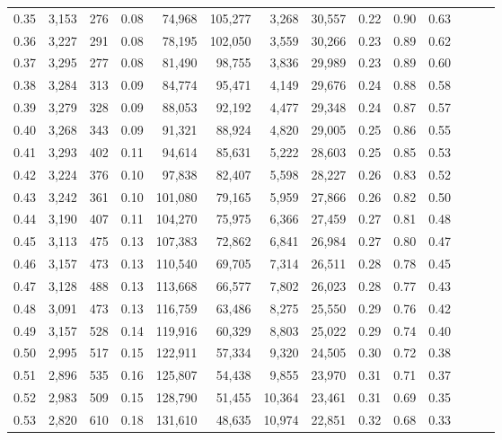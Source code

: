 \begin{tabular}{rrrrrrrrrrrrrr}
0.35 &  3,153 &  276 &  0.08 &   74,968 &  105,277 &   3,268 &  30,557 &  0.22 &  0.90 &      0.63 \\
0.36 &  3,227 &  291 &  0.08 &   78,195 &  102,050 &   3,559 &  30,266 &  0.23 &  0.89 &      0.62 \\
0.37 &  3,295 &  277 &  0.08 &   81,490 &   98,755 &   3,836 &  29,989 &  0.23 &  0.89 &      0.60 \\
0.38 &  3,284 &  313 &  0.09 &   84,774 &   95,471 &   4,149 &  29,676 &  0.24 &  0.88 &      0.58 \\
0.39 &  3,279 &  328 &  0.09 &   88,053 &   92,192 &   4,477 &  29,348 &  0.24 &  0.87 &      0.57 \\
0.40 &  3,268 &  343 &  0.09 &   91,321 &   88,924 &   4,820 &  29,005 &  0.25 &  0.86 &      0.55 \\
0.41 &  3,293 &  402 &  0.11 &   94,614 &   85,631 &   5,222 &  28,603 &  0.25 &  0.85 &      0.53 \\
0.42 &  3,224 &  376 &  0.10 &   97,838 &   82,407 &   5,598 &  28,227 &  0.26 &  0.83 &      0.52 \\
0.43 &  3,242 &  361 &  0.10 &  101,080 &   79,165 &   5,959 &  27,866 &  0.26 &  0.82 &      0.50 \\
0.44 &  3,190 &  407 &  0.11 &  104,270 &   75,975 &   6,366 &  27,459 &  0.27 &  0.81 &      0.48 \\
0.45 &  3,113 &  475 &  0.13 &  107,383 &   72,862 &   6,841 &  26,984 &  0.27 &  0.80 &      0.47 \\
0.46 &  3,157 &  473 &  0.13 &  110,540 &   69,705 &   7,314 &  26,511 &  0.28 &  0.78 &      0.45 \\
0.47 &  3,128 &  488 &  0.13 &  113,668 &   66,577 &   7,802 &  26,023 &  0.28 &  0.77 &      0.43 \\
0.48 &  3,091 &  473 &  0.13 &  116,759 &   63,486 &   8,275 &  25,550 &  0.29 &  0.76 &      0.42 \\
0.49 &  3,157 &  528 &  0.14 &  119,916 &   60,329 &   8,803 &  25,022 &  0.29 &  0.74 &      0.40 \\
0.50 &  2,995 &  517 &  0.15 &  122,911 &   57,334 &   9,320 &  24,505 &  0.30 &  0.72 &      0.38 \\
0.51 &  2,896 &  535 &  0.16 &  125,807 &   54,438 &   9,855 &  23,970 &  0.31 &  0.71 &      0.37 \\
0.52 &  2,983 &  509 &  0.15 &  128,790 &   51,455 &  10,364 &  23,461 &  0.31 &  0.69 &      0.35 \\
0.53 &  2,820 &  610 &  0.18 &  131,610 &   48,635 &  10,974 &  22,851 &  0.32 &  0.68 &      0.33 \\

\end{tabular}
